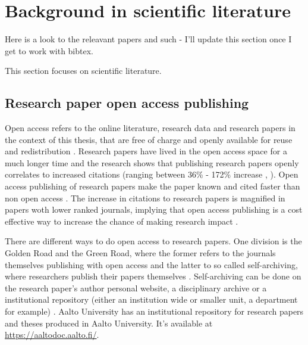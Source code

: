 \chapter{Background in scientific literature}
\label{chapter:background} 

Here is a look to the releavant papers and such - I'll update this section once
I get to work with bibtex.

This section focuses on scientific literature.

\section{Research paper open access publishing}
\label{sec:benefits_open_publishing}

Open access refers to the online literature, research data and research papers in the
context of this thesis, that are free of charge and openly available for reuse
and redistribution \cite{suber2007open}\cite{bailey2008open}. Research papers
have lived in the open access space for a much longer time and the research
shows that publishing research papers openly correlates to increased citations
(ranging between 36\% - 172\% increase \cite{DBLP:journals/corr/abs-cs-0606079},
\cite{harnad2004comparing}\cite{eysenbach2006citation}). Open access publishing of research papers make the
paper known and cited faster than non open access \cite{harnad2004comparing}.
The increase in citations to research papers is magnified in papers woth lower
ranked journals, implying that open access publishing is a cost effective way
to increase the chance of making research impact
\cite{DBLP:journals/oir/XiaN12}.

There are different ways to do open access to research papers. One division is
the Golden Road and the Green Road, where the former refers to the journals
themselves publishing with open access and the latter to so called
self-archiving, where researchers publish their papers themselves \cite{harnad2004access}.
Self-archiving can be done on the research paper's author personal website,
a disciplinary archive or a institutional repository (either an institution
wide or smaller unit, a department for example) \cite{bailey2008open}. Aalto
University has an institutional repository for research papers and theses
produced in Aalto University. It's available at \url{https://aaltodoc.aalto.fi/}.

